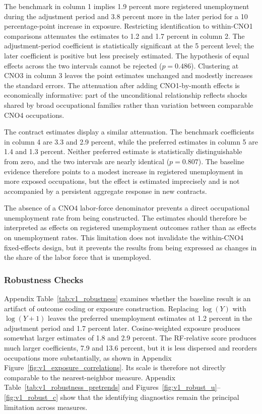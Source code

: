 \documentclass[11pt]{article}
\begin{document}
The benchmark in column 1 implies 1.9 percent more registered unemployment during the adjustment period and 3.8 percent more in the later period for a 10 percentage-point increase in exposure. Restricting identification to within-CNO1 comparisons attenuates the estimates to 1.2 and 1.7 percent in column 2. The adjustment-period coefficient is statistically significant at the 5 percent level; the later coefficient is positive but less precisely estimated. The hypothesis of equal effects across the two intervals cannot be rejected (\(p=0.486\)). Clustering at CNO3 in column 3 leaves the point estimates unchanged and modestly increases the standard errors. The attenuation after adding CNO1-by-month effects is economically informative: part of the unconditional relationship reflects shocks shared by broad occupational families rather than variation between comparable CNO4 occupations.

The contract estimates display a similar attenuation. The benchmark coefficients in column 4 are 3.3 and 2.9 percent, while the preferred estimates in column 5 are 1.4 and 1.3 percent. Neither preferred estimate is statistically distinguishable from zero, and the two intervals are nearly identical (\(p=0.807\)). The baseline evidence therefore points to a modest increase in registered unemployment in more exposed occupations, but the effect is estimated imprecisely and is not accompanied by a persistent aggregate response in new contracts.

The absence of a CNO4 labor-force denominator prevents a direct occupational unemployment rate from being constructed. The estimates should therefore be interpreted as effects on registered unemployment outcomes rather than as effects on unemployment rates. This limitation does not invalidate the within-CNO4 fixed-effects design, but it prevents the results from being expressed as changes in the share of the labor force that is unemployed.

\subsubsection{Robustness Checks}
\label{sec:v1_robustness}

Appendix Table~\ref{tab:v1_robustness} examines whether the baseline result is an artifact of outcome coding or exposure construction. Replacing \(\log(Y)\) with \(\log(Y+1)\) leaves the preferred unemployment estimates at 1.2 percent in the adjustment period and 1.7 percent later. Cosine-weighted exposure produces somewhat larger estimates of 1.8 and 2.9 percent. The RF-relative score produces much larger coefficients, 7.9 and 13.6 percent, but it is less dispersed and reorders occupations more substantially, as shown in Appendix Figure~\ref{fig:v1_exposure_correlations}. Its scale is therefore not directly comparable to the nearest-neighbor measure. Appendix Table~\ref{tab:v1_robustness_pretrends} and Figures~\ref{fig:v1_robust_u}--\ref{fig:v1_robust_c} show that the identifying diagnostics remain the principal limitation across measures.
\end{document}
